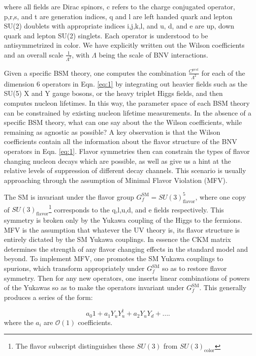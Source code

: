 \documentclass[aps,twocolumn,twoside,secnumarabic,balancelastpage,amsmath,amssymb,nofootinbib,hyperref=pdftex]{revtex4}
\begin{document}
where all fields are Dirac spinors, c refers to the charge conjugated operator, p,r,s, and t are generation indices,
 q and l are left handed quark and lepton SU(2) doublets with appropriate indices i,j,k,l, and u, d, and e are up, down quark and lepton SU(2) singlets. Each operator is understood to be antisymmetrized in color. We have explicitly written out the Wilson coefficients and an overall scale $\frac{1}{\Lambda^2}$, with $\Lambda$ being the scale of BNV interactions. 

Given a specific BSM theory, one computes the combination $\frac{C^{prst}}{\Lambda^2}$ for each of the dimension 6 operators in Eqn. \ref{eq:1} by integrating out heavier fields such as the SU(5) X and Y gauge bosons, or the heavy triplet Higgs fields, and then computes nucleon lifetimes. In this way, the parameter space of each BSM theory can be constrained by existing nucleon lifetime measurements. In the absence of a specific BSM theory, what can one say about the the Wilson coefficients, while remaining as agnostic as possible? A key observation is that the Wilson coefficients contain all the information about the flavor structure of the BNV operators in Eqn. \ref{eq:1}. Flavor symmetries then can constrain the types of flavor changing nucleon decays which are possible, as well as give us a hint at the relative levels of suppression of different decay channels. This scenario is usually approaching through the assumption of Minimal Flavor Violation (MFV). 

The SM is invariant under the flavor group $G^{\text{SM}}_{f} = SU(3)^{5}_{\text{flavor}}$, where one copy of $SU(3)_{\text{flavor}}$\footnote{The flavor subscript distinguishes these $SU(3)$ from $SU(3)_{\text{color}}$} corresponds to the q,l,u,d, and e fields respectively. This symmetry is broken only by the Yukawa coupling of the Higgs to the fermions. MFV is the assumption that whatever the UV theory is, its flavor structure is entirely dictated by the SM Yukawa couplings. In essence the CKM matrix determines the strength of any flavor changing effects in the standard model and beyond. To implement MFV, one promotes the SM Yukawa couplings to spurions, which transform appropriately under  $G^{\text{SM}}_{f}$ so as to restore flavor symmetry. Then for any new operators, one inserts linear combinations of powers of the Yukawas so as to make the operators invariant under  $G^{\text{SM}}_{f}$. This generally produces a series of the form:

\begin{equation}
a_{0}1 + a_{1}Y_{u}Y^{\dagger}_{u} + a_{2}Y_{u}Y_{d} + . . . . 
\end{equation}
where the $a_{i}$ are $\mathcal{O}(1)$ coefficients.
\end{document}

